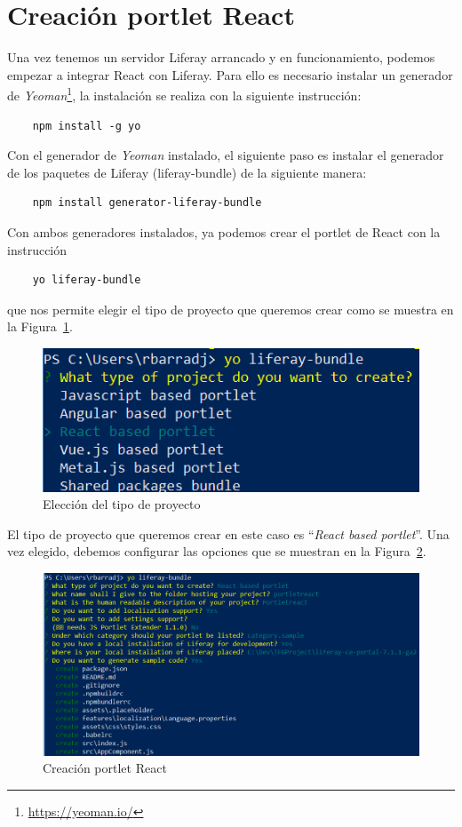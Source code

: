 \documentclass[a4paper, 12pt]{book}
\begin{document}
\section{Creación portlet React}
\label{sec:creacion-portlet-react}
Una vez tenemos un servidor Liferay arrancado y en funcionamiento, podemos empezar a integrar React con Liferay. Para ello es necesario instalar un generador de \textit{Yeoman}\footnote{\url{https://yeoman.io/}}, la instalación se realiza con la siguiente instrucción: 
\begin{verbatim}
    npm install -g yo
\end{verbatim}

Con el generador de \textit{Yeoman} instalado, el siguiente paso es instalar el generador de los paquetes de Liferay (liferay-bundle) de la siguiente manera:
\begin{verbatim}
    npm install generator-liferay-bundle
\end{verbatim}

Con ambos generadores instalados, ya podemos crear el portlet de React con la instrucción 
\begin{verbatim}
    yo liferay-bundle
\end{verbatim} 
que nos permite elegir el tipo de proyecto que queremos crear como se muestra en la Figura~\ref{fig:liferay_type}.
\begin{figure}[h]
  \centering
  \includegraphics{img_usadas/liferay-bundle-react.png}
  \caption{Elección del tipo de proyecto}
  \label{fig:liferay_type}
\end{figure}

El tipo de proyecto que queremos crear en este caso es ``\textit{React based portlet}''. Una vez elegido, debemos configurar las opciones que se muestran en la Figura~\ref{fig:liferay_generator_portlet}.
\begin{figure}[t]
  \centering
  \includegraphics{img_usadas/liferay-bundle-generator.png}
  \caption{Creación portlet React}
  \label{fig:liferay_generator_portlet}
\end{figure}
\end{document}
